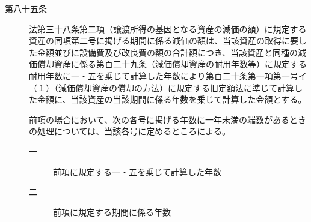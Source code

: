 \documentclass[twocolumn,a4j,10pt]{ltjtarticle}
\begin{document}
\begin{description}
\item[第八十五条]法第三十八条第二項（譲渡所得の基因となる資産の減価の額）に規定する資産の同項第二号に掲げる期間に係る減価の額は、当該資産の取得に要した金額並びに設備費及び改良費の額の合計額につき、当該資産と同種の減価償却資産に係る第百二十九条（減価償却資産の耐用年数等）に規定する耐用年数に一・五を乗じて計算した年数により第百二十条第一項第一号イ（１）（減価償却資産の償却の方法）に規定する旧定額法に準じて計算した金額に、当該資産の当該期間に係る年数を乗じて計算した金額とする。
\item[]前項の場合において、次の各号に掲げる年数に一年未満の端数があるときの処理については、当該各号に定めるところによる。
\begin{description}
\item[一]前項に規定する一・五を乗じて計算した年数
\item[二]前項に規定する期間に係る年数
\end{description}
\end{description}
\end{document}
